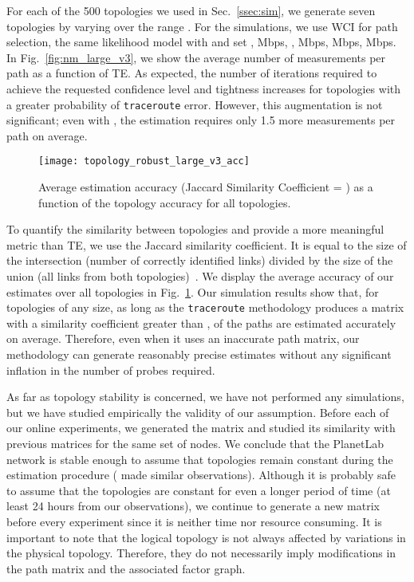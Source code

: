 \documentclass[final,5p,times,twocolumn]{elsarticle}
\begin{document}
For each of the 500 topologies we used in Sec.~\ref{ssec:sim}, we generate seven topologies by varying  over the range .  
For the simulations, we use WCI for path selection, the same likelihood model with  and set ,  Mbps, ,  Mbps,  Mbps,  Mbps. 
In Fig.~\ref{fig:nm_large_v3}, we show the average number of measurements per path as a function of TE. 
As expected, the number of iterations required to achieve the requested confidence level and tightness increases for topologies with a greater probability of \texttt{traceroute} error.
However, this augmentation is not significant; even with , the estimation requires only 1.5 more measurements per path on average.

\begin{figure} [!h]
\centering
\texttt{[image: topology\_robust\_large\_v3\_acc]}
\caption{Average estimation accuracy (Jaccard Similarity Coefficient = ) as a function of the topology accuracy for all topologies. \label{fig:acc_large_v3}}
\end{figure}

To quantify the similarity between topologies and provide a more meaningful metric than TE, we use the Jaccard similarity coefficient. It is equal to the size of the intersection (number of correctly identified links) divided by the size of the union (all links from both topologies)~\cite{jac:1901}.
We display the average accuracy of our estimates over all topologies in Fig.~\ref{fig:acc_large_v3}.  
Our simulation results show that, for topologies of any size, as long as the \texttt{traceroute} methodology produces a matrix  with a similarity coefficient greater than ,  of the paths are estimated accurately on average.  Therefore, even when it uses an inaccurate path matrix, our methodology can generate reasonably precise estimates without any significant inflation in the number of probes required.

As far as topology stability is concerned, we have not performed any simulations, but we have studied empirically the validity of our assumption.  
Before each of our online experiments, we generated the matrix  and studied its similarity with previous matrices for the same set of nodes.
We conclude that the PlanetLab network is stable enough to assume that topologies remain constant during the estimation procedure (\citet{son:07} made similar observations).  Although it is probably safe to assume that the topologies are constant for even a longer period of time (at least 24 hours from our observations), we continue to generate a new matrix  before every experiment since it is neither time nor resource consuming.  It is important to note that the logical topology is not always affected by variations in the physical topology.  Therefore, they do not necessarily imply modifications in the path matrix and the associated factor graph.  
\end{document}
